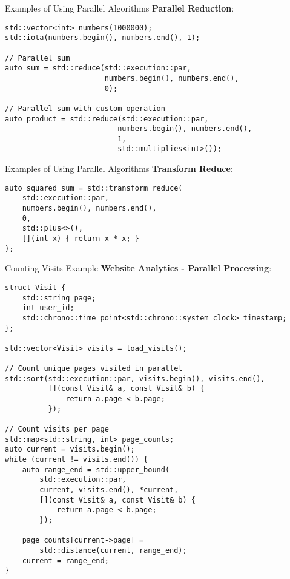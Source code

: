 \begin{frame}[fragile]{Examples of Using Parallel Algorithms}
	\textbf{Parallel Reduction}:
	\begin{verbatim}
std::vector<int> numbers(1000000);
std::iota(numbers.begin(), numbers.end(), 1);

// Parallel sum
auto sum = std::reduce(std::execution::par,
                       numbers.begin(), numbers.end(),
                       0);

// Parallel sum with custom operation
auto product = std::reduce(std::execution::par,
                          numbers.begin(), numbers.end(),
                          1,
                          std::multiplies<int>());
	\end{verbatim}
\end{frame}

\begin{frame}[fragile]{Examples of Using Parallel Algorithms}
	\textbf{Transform Reduce}:
	\begin{verbatim}
auto squared_sum = std::transform_reduce(
    std::execution::par,
    numbers.begin(), numbers.end(),
    0,
    std::plus<>(),
    [](int x) { return x * x; }
);
	\end{verbatim}
\end{frame}


\begin{frame}[fragile]{Counting Visits Example}
	\textbf{Website Analytics - Parallel Processing}:

	\begin{verbatim}
struct Visit {
    std::string page;
    int user_id;
    std::chrono::time_point<std::chrono::system_clock> timestamp;
};

std::vector<Visit> visits = load_visits();

// Count unique pages visited in parallel
std::sort(std::execution::par, visits.begin(), visits.end(),
          [](const Visit& a, const Visit& b) {
              return a.page < b.page;
          });

// Count visits per page
std::map<std::string, int> page_counts;
auto current = visits.begin();
while (current != visits.end()) {
    auto range_end = std::upper_bound(
        std::execution::par,
        current, visits.end(), *current,
        [](const Visit& a, const Visit& b) {
            return a.page < b.page;
        });

    page_counts[current->page] =
        std::distance(current, range_end);
    current = range_end;
}
	\end{verbatim}
\end{frame}

